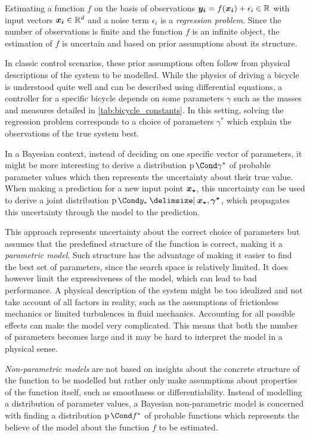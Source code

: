 Estimating a function $f$ on the basis of observations $\bm{y_i} = f(\bm{x_i}) + \epsilon_i \in \mathbb{R}$ with input vectors $\bm{x_i} \in \mathbb{R}^d$ and a noise term $\epsilon_i$ is a \emph{regression problem}.
Since the number of observations is finite and the function $f$ is an infinite object, the estimation of $f$ is uncertain and based on prior assumptions about its structure.

In classic control scenarios, these prior assumptions often follow from physical descriptions of the system to be modelled.
While the physics of driving a bicycle is understood quite well and can be described using differential equations, a controller for a specific bicycle depends on some parameters $\gamma$ such as the masses and measures detailed in \cref{tab:bicycle_constants}.
In this setting, solving the regression problem corresponds to a choice of parameters $\gamma^\ast$ which explain the observations of the true system best.

In a Bayesian context, instead of deciding on one specific vector of parameters, it might be more interesting to derive a distribution $\Prob{\gamma^*}$ of probable parameter values which then represents the uncertainty about their true value.
When making a prediction for a new input point $\bm{x_\ast}$, this uncertainty can be used to derive a joint distribution $\Prob{y_\ast \given \mat{x_\ast}, \mat{\gamma^\ast}}$, which propagates this uncertainty through the model to the prediction.

This approach represents uncertainty about the correct choice of parameters but assumes that the predefined structure of the function is correct, making it a \emph{parametric model}.
Such structure has the advantage of making it easier to find the best set of parameters, since the search space is relatively limited.
It does however limit the expressiveness of the model, which can lead to bad performance.
A physical description of the system might be too idealized and not take account of all factors in reality, such as the assumptions of frictionless mechanics or limited turbulences in fluid mechanics.
Accounting for all possible effects can make the model very complicated.
This means that both the number of parameters becomes large and it may be hard to interpret the model in a physical sense.

\emph{Non-parametric models} are not based on insights about the concrete structure of the function to be modelled but rather only make assumptions about properties of the function itself, such as smoothness or differentiability.
Instead of modelling a distribution of parameter values, a Bayesian non-parametric model is concerned with finding a distribution $\Prob{f^\ast}$ of probable functions which represents the believe of the model about the function $f$ to be estimated.

